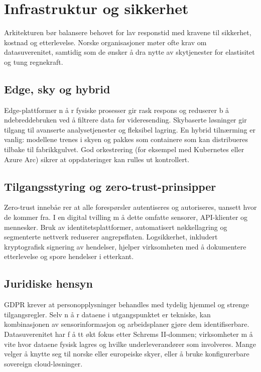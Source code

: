 \section{Infrastruktur og sikkerhet}
Arkitekturen bør balansere behovet for lav responstid med kravene til sikkerhet, kostnad og etterlevelse. Norske organisasjoner møter ofte krav om datasuverenitet, samtidig som de ønsker  å dra nytte av skytjenester for elastisitet og tung regnekraft.

\subsection{Edge, sky og hybrid}
Edge-plattformer n å r fysiske prosesser gir rask respons og reduserer b å ndebreddebruken ved  å filtrere data før videresending. Skybaserte løsninger gir tilgang til avanserte analysetjenester og fleksibel lagring. En hybrid tilnærming er vanlig: modellene trenes i skyen og pakkes som containere som kan distribueres tilbake til fabrikkgulvet. God orkestrering (for eksempel med Kubernetes eller Azure Arc) sikrer at oppdateringer kan rulles ut kontrollert.

\subsection{Tilgangsstyring og zero-trust-prinsipper}
Zero-trust innebåe rer at alle forespørsler autentiseres og autoriseres, uansett hvor de kommer fra. I en digital tvilling m å dette omfatte sensorer, API-klienter og mennesker. Bruk av identitetsplattformer, automatisert nøkkellagring og segmenterte nettverk reduserer angrepsflaten. Logsikkerhet, inkludert kryptografisk signering av hendelser, hjelper virksomheten med  å dokumentere etterlevelse og spore hendelser i etterkant.

\subsection{Juridiske hensyn}
GDPR krever at personopplysninger behandles med tydelig hjemmel og strenge tilgangsregler. Selv n å r dataene i utgangspunktet er tekniske, kan kombinasjonen av sensorinformasjon og arbeidsplaner gjøre dem identifiserbare. Datasuverenitet har f å tt økt fokus etter Schrems II-dommen; virksomheter m å vite hvor dataene fysisk lagres og hvilke underleverandører som involveres. Mange velger  å knytte seg til norske eller europeiske skyer, eller  å bruke konfigurerbare sovereign cloud-løsninger.

